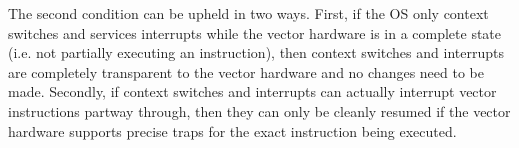 The second condition can be upheld in two ways.
First, if the OS only context switches and services interrupts while the vector hardware is in a complete state (i.e. not partially executing an instruction), then context switches and interrupts are completely transparent to the vector hardware and no changes need to be made.
Secondly, if context switches and interrupts can actually interrupt vector instructions partway through, then they can only be cleanly resumed if the vector hardware supports precise traps for the exact instruction being executed.